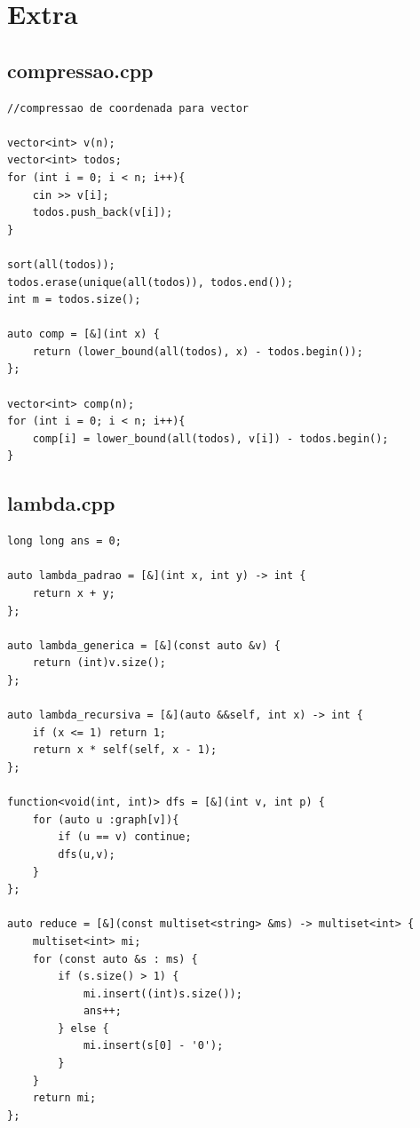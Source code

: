 \documentclass[11pt, a4paper, twoside]{article}
\begin{document}
{{\pagebreak


%
%

\section{Extra}

\subsection{compressao.cpp}
\begin{lstlisting}
//compressao de coordenada para vector

vector<int> v(n);
vector<int> todos;
for (int i = 0; i < n; i++){
    cin >> v[i];
    todos.push_back(v[i]);
}

sort(all(todos));
todos.erase(unique(all(todos)), todos.end());
int m = todos.size();

auto comp = [&](int x) {
    return (lower_bound(all(todos), x) - todos.begin());
};

vector<int> comp(n);
for (int i = 0; i < n; i++){
    comp[i] = lower_bound(all(todos), v[i]) - todos.begin();
}
\end{lstlisting}

\subsection{lambda.cpp}
\begin{lstlisting}
long long ans = 0;

auto lambda_padrao = [&](int x, int y) -> int {
    return x + y;
};

auto lambda_generica = [&](const auto &v) {
    return (int)v.size();
};

auto lambda_recursiva = [&](auto &&self, int x) -> int {
    if (x <= 1) return 1;
    return x * self(self, x - 1);
};

function<void(int, int)> dfs = [&](int v, int p) {
    for (auto u :graph[v]){
        if (u == v) continue;
        dfs(u,v);
    }
};

auto reduce = [&](const multiset<string> &ms) -> multiset<int> {
    multiset<int> mi;
    for (const auto &s : ms) {
        if (s.size() > 1) {
            mi.insert((int)s.size());
            ans++;
        } else {
            mi.insert(s[0] - '0');
        }
    }
    return mi;
};

\end{lstlisting}

}}
\end{document}
